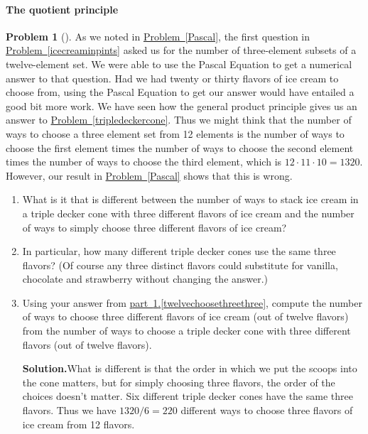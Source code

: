 \documentclass[10pt,]{book}
\theoremstyle{plain}
\theoremstyle{definition}
\newtheorem{activity}[project]{Problem}
\theoremstyle{definition}
\numberwithin{equation}{chapter}
\begin{document}
\paragraph[{The quotient principle}]{The quotient principle}\hypertarget{paragraphs-6}{}
\begin{activity}[]\label{twelvechoosethree}
As we noted in \hyperref[Pascal]{Problem~\ref{Pascal}}, the first question in \hyperref[icecreaminpints]{Problem~\ref{icecreaminpints}} asked us for the number of three-element subsets of a twelve-element set. We were able to use the Pascal Equation to get a numerical answer to that question. Had we had twenty or thirty flavors of ice cream to choose from, using the Pascal Equation to get our answer would have entailed a good bit more work. We have seen how the general product principle gives us an answer to \hyperref[tripledeckercone]{Problem~\ref{tripledeckercone}}. Thus we might think that the number of ways to choose a three element set from 12 elements is the number of ways to choose the first element times the number of ways to choose the second element times the number of ways to choose the third element, which is \(12\cdot11\cdot10=1320\). However, our result in \hyperref[Pascal]{Problem~\ref{Pascal}} shows that this is wrong.%
\begin{enumerate}[font=\bfseries,label=(\alph*),ref=\alph*]
\item\label{task-31} What is it that is different between the number of ways to stack ice cream in a triple decker cone with three different flavors of ice cream and the number of ways to simply choose three different flavors of ice cream?%
\item\label{twelvechoosethreethree} In particular, how many different triple decker cones use the same three flavors?  (Of course any three distinct flavors could substitute for vanilla, chocolate and strawberry without changing the answer.)%
\item\label{twelvechoosethreefinal} Using your answer from \hyperref[twelvechoosethreethree]{part~\ref{twelvechoosethree}.\ref{twelvechoosethreethree}}, compute the number of ways to choose three different flavors of ice cream (out of twelve flavors) from the number of ways to choose a triple decker cone with three different flavors (out of twelve flavors).%
\par\medskip\noindent%
\textbf{Solution.}\quad What is different is that the order in which we put the scoops into the cone matters, but for simply choosing three flavors, the order of the choices doesn't matter. Six different triple decker cones have the same three flavors. Thus we have \(1320/6=220\) different ways to choose three flavors of ice cream from 12 flavors.%
\end{enumerate}
\end{activity}
\end{document}
